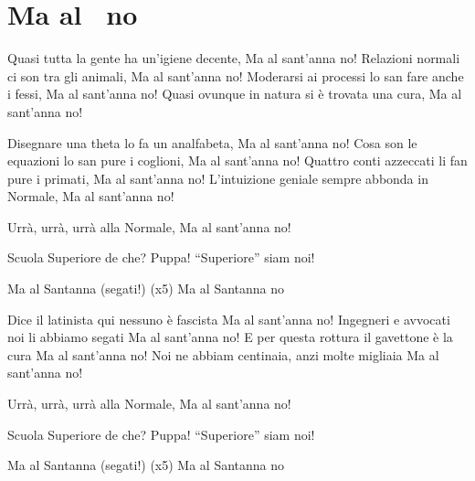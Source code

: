 \section{Ma al \santanna\ no}
\subtitle{Sulla melodia di “Ma la notte no”}
\begin{canzone}
Quasi tutta la gente ha un’igiene decente,
Ma al sant'anna no!
Relazioni normali ci son tra gli animali,
Ma al sant'anna no!
Moderarsi ai processi lo san fare anche i fessi,
Ma al sant'anna no!
Quasi ovunque in natura si è trovata una cura,
Ma al sant'anna no!

Disegnare una theta lo fa un analfabeta,
Ma al sant'anna no!
Cosa son le equazioni lo san pure i coglioni,
Ma al sant'anna no!
Quattro conti azzeccati li fan pure i primati,
Ma al sant'anna no!
L’intuizione geniale sempre abbonda in Normale,
Ma al sant'anna no!

Urrà, urrà, urrà alla Normale,
Ma al sant'anna no!

Scuola Superiore de che?
Puppa! “Superiore” siam noi!

Ma al Santanna (segati!) (x5)
Ma al Santanna no

Dice il latinista qui nessuno è fascista
Ma al sant'anna no!
Ingegneri e avvocati noi li abbiamo segati
Ma al sant'anna no!
E per questa rottura il gavettone è la cura
Ma al sant'anna no!
Noi ne abbiam centinaia, anzi molte migliaia
Ma al sant'anna no!

Urrà, urrà, urrà alla Normale,
Ma al sant'anna no!

Scuola Superiore de che?
Puppa! “Superiore” siam noi!

Ma al Santanna (segati!) (x5)
Ma al Santanna no
\end{canzone}
